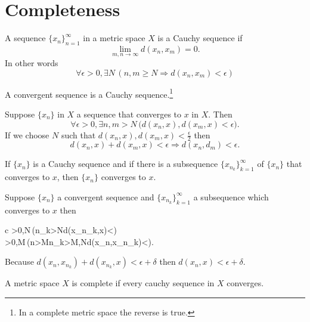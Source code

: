 \documentclass[nobib,notoc]{tufte-handout}
\begin{document}
\section{Completeness}
\begin{defi}
	A sequence \(\{x_n\}_{n=1}^{\infty}\) in a metric space \(X\) is a Cauchy sequence if
	\begin{equation*}
		\lim_{m,n\rightarrow\infty}d(x_n,x_m)=0.
	\end{equation*}
	In other words
	\begin{equation*}
		\forall\epsilon>0,\exists N\,(n,m\geq N\Rightarrow d(x_n,x_m)<\epsilon)
	\end{equation*}
\end{defi}
\begin{lem}
	\label{conviscauchy}
	A convergent sequence is a Cauchy sequence.\footnote{In a complete metric space the reverse is true.}
	\begin{IEEEproof}
		Suppose \(\{x_n\}\) in \(X\) a sequence that converges to \(x\) in \(X\). Then
		\begin{equation*}
			\forall\epsilon>0,\exists n,m>N\,\big(d(x_n,x),d(x_m,x)<\epsilon\big).
		\end{equation*}
		If we choose \(N\) such that \(d(x_n,x),d(x_m,x)<\frac{\epsilon}{2}\) then
		\begin{equation*}
			d(x_n,x)+d(x_m,x)<\epsilon\Rightarrow d(x_n,d_m)<\epsilon.
		\end{equation*}
	\end{IEEEproof}
\end{lem}
\begin{lem}
	\label{cauchysubconverge}
	If \(\{x_n\}\) is a Cauchy sequence and if there is a subsequence \(\{x_{n_k}\}_{k=1}^{\infty}\) of \(\{x_n\}\) that converges to \(x\), then \(\{x_n\}\) converges to \(x\).
	\begin{IEEEproof}
		Suppose \(\{x_n\}\) a convergent sequence and \(\{x_{n_k}\}_{k=1}^{\infty}\) a subsequence which converges to \(x\) then
		\begin{IEEEeqnarray*}{c}
			\forall\delta>0,\exists N\,(n_k>N\Rightarrow d(x_{n_k},x)<\delta)\\
			\forall\epsilon>0,\exists M\,(n>M\wedge n_k>M,N\Rightarrow d(x_n,x_{n_k})<\epsilon).
		\end{IEEEeqnarray*}
		Because \(d(x_n,x_{n_k})+d(x_{n_k},x)<\epsilon+\delta\) then \(d(x_n,x)<\epsilon+\delta\).
	\end{IEEEproof}
\end{lem}
\begin{defi}
	A metric space \(X\) is complete if every cauchy sequence in \(X\) converges.
\end{defi}
\end{document}
